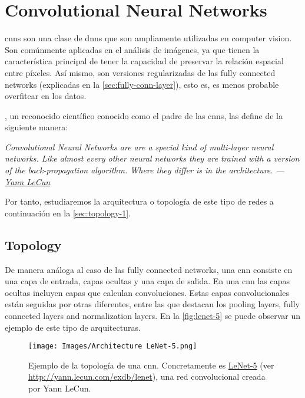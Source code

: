 \section{Convolutional Neural Networks}
\label{sec:conv-neur-netw}

\glspl{cnn} son una clase de \glspl{dnn} que son ampliamente utilizadas en
computer vision. Son comúnmente aplicadas en el análisis de imágenes, ya que
tienen la característica principal de tener la capacidad de preservar la
relación espacial entre píxeles. Así mismo, son versiones regularizadas de las
fully connected networks (explicadas en la \vref{sec:fully-conn-layer}), esto
es, es menos probable overfitear en los datos.

, un reconocido científico
conocido como el padre de las \glspl{cnn}, las define de la siguiente manera:
\begin{quoteBox}
  \itshape
  Convolutional Neural Networks are are a special kind of multi-layer neural
  networks. Like almost every other neural networks they are trained with a
  version of the back-propagation algorithm. Where they differ is in the
  architecture.
  \tcblower
  \hfill \upshape
  ---\href{http://yann.lecun.com/index.html}{Yann LeCun}
\end{quoteBox}

Por tanto, estudiaremos la arquitectura o topología de este tipo de redes a
continuación en la \vref{sec:topology-1}.

\subsection{Topology} \label{sec:topology-1}

De manera análoga al caso de las fully connected networks, una \gls{cnn}
consiste en una capa de entrada, capas ocultas y una capa de salida. En una
\gls{cnn} las capas ocultas incluyen capas que calculan convoluciones. Estas
capas convolucionales están seguidas por otras diferentes, entre las que
destacan los pooling layers, fully connected layers and normalization
layers. En la \vref{fig:lenet-5} se puede observar un ejemplo de este
tipo de arquitecturas.

\begin{figure}[ht]
  \centering
  \texttt{[image: Images/Architecture LeNet-5.png]}
  \caption[Ejemplo de topología de una \acs*{cnn} (LeNet-5)]{Ejemplo de la
    topología de una \gls{cnn}. Concretamente es
    \href{http://yann.lecun.com/exdb/lenet}{LeNet-5} (ver
    \url{http://yann.lecun.com/exdb/lenet}), una red convolucional creada por
    Yann LeCun.}
  \label{fig:lenet-5}
\end{figure}

